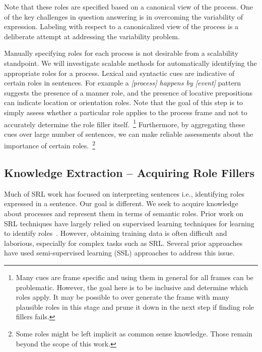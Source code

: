 Note that these roles are specified based on a canonical view of the process. One of the key challenges in question answering is in overcoming the variability of expression. Labeling with respect to a canonicalized view of the process is a deliberate attempt at addressing the variability problem. 

%

Manually specifying roles for each process is not desirable from a scalability standpoint.
We will investigate scalable methods for automatically identifying the appropriate roles for a process. 
Lexical and syntactic cues are indicative of certain roles in sentences. 
For example a {\em [process] happens by [event]} pattern suggests the presence of a manner role, and the presence of locative prepositions can indicate location or orientation roles. 
Note that the goal of this step is to simply assess whether a particular role applies to the process frame and not to accurately determine the role filler itself.~\footnote{
Many cues are frame specific and using them in general for all frames can be problematic. 
However, the goal here is to be inclusive and determine which roles apply. 
It may be possible to over generate the frame with many plausible roles in this stage and prune it down in the next step if finding role fillers fails.} 
Furthermore, by aggregating these cues over large number of sentences, we can make reliable assessments about the importance of certain roles.~\footnote{
Some roles might be left implicit as common sense knowledge. 
Those remain beyond the scope of this work.} 

\subsection{Knowledge Extraction -- Acquiring Role Fillers}

Much of SRL work has focused on interpreting sentences i.e., identifying roles expressed in a sentence.
Our goal is different. We seek to acquire knowledge about processes and represent them in terms of semantic roles.
Prior work on SRL techniques have largely relied on supervised learning techniques for learning to identify roles~\cite{}.
However, obtaining training data is often difficult and laborious, especially for complex tasks such as SRL.
Several prior approaches have used semi-supervised learning (SSL) approaches to address this issue. 

